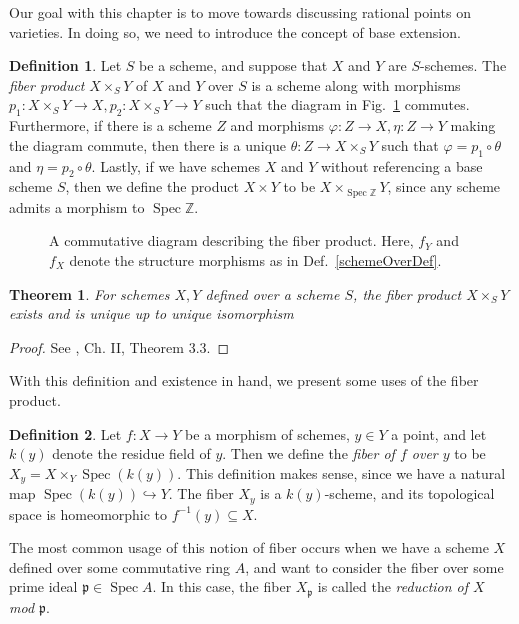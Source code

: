 \documentclass[12pt,twoside]{reedthesis}
\theoremstyle{plain}
\newtheorem{theorem}{Theorem}[chapter]
\theoremstyle{definition}
\newtheorem{definition}{Definition}[section]
\theoremstyle{remark}
\newcommand{\ZZ}{\mathbb{Z}}
\newcommand{\Spec}{\operatorname{Spec}}
\begin{document}
Our goal with this chapter is to move towards discussing rational points on varieties. In doing so, we need to introduce the concept of base extension.
\begin{definition}
Let $S$ be a scheme, and suppose that $X$ and $Y$ are $S$-schemes. The \emph{fiber product} $X\times_S Y$ of $X$ and $Y$ over $S$ is a scheme along with morphisms $p_1:X\times_S Y\to X, p_2:X\times_S Y\to Y$ such that the diagram in Fig.~\ref{fibDiag} commutes. Furthermore, if there is a scheme $Z$ and morphisms $\varphi:Z\to X, \eta:Z\to Y$ making the diagram commute, then there is a unique $\theta:Z\to X\times_S Y$ such that $\varphi=p_1\circ\theta$ and $\eta=p_2\circ\theta$. Lastly, if we have schemes $X$ and $Y$ without referencing a base scheme $S$, then we define the product $X\times Y$ to be $X\times_{\Spec\ZZ} Y$, since any scheme admits a morphism to $\Spec\ZZ$.
\begin{figure}[h]
\centering
{}
\caption{A commutative diagram describing the fiber product. Here, $f_Y$ and $f_X$ denote the structure morphisms as in Def.~\ref{schemeOverDef}.}
\label{fibDiag}
\end{figure}
\end{definition}
\begin{theorem}
For schemes $X,Y$ defined over a scheme $S$, the fiber product $X\times_S Y$ exists and is unique up to unique isomorphism
\end{theorem}
\begin{proof}
See \cite{hartshorne}, Ch. II, Theorem 3.3.
\end{proof}
With this definition and existence in hand, we present some uses of the fiber product.
\begin{definition}
Let $f:X\to Y$ be a morphism of schemes, $y\in Y$ a point, and let $k(y)$ denote the residue field of $y$. Then we define the \emph{fiber of $f$ over $y$} to be $X_y=X\times_Y\Spec(k(y))$. This definition makes sense, since we have a natural map $\Spec(k(y))\hookrightarrow Y$. The fiber $X_y$ is a $k(y)$-scheme, and its topological space is homeomorphic to $f^{-1}(y)\subseteq X$.
\end{definition}
\noindent The most common usage of this notion of fiber occurs when we have a scheme $X$ defined over some commutative ring $A$, and want to consider the fiber over some prime ideal $\mathfrak{p}\in\Spec A$. In this case, the fiber $X_\mathfrak{p}$ is called the \emph{reduction of $X$ mod $\mathfrak{p}$}. 
\end{document}

